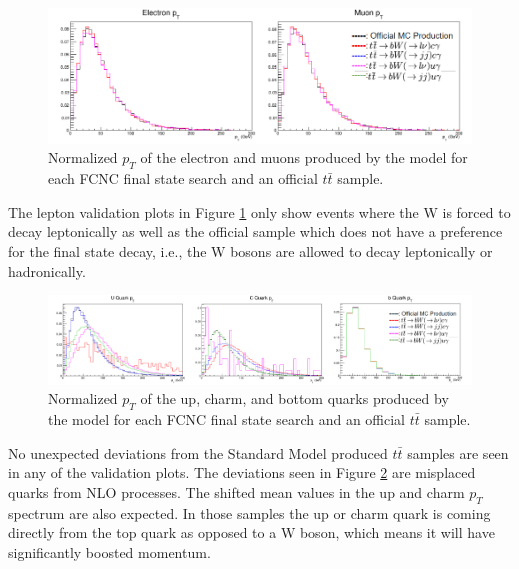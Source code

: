 \begin{figure}[h!]
	\centering
	\includegraphics[width=\columnwidth]{../ThesisImages/FCNCValidation/lepton.png}
	\caption{Normalized $p_T$ of the electron and muons produced by the model for each FCNC final state search and an official $t\bar{t}$ sample.
	}
	\label{fig:LepVal}
\end{figure} 

The lepton validation plots in Figure \ref{fig:LepVal} only show events where the W is forced to decay leptonically as well as the official sample which does not have a preference for the final state decay, i.e., the W bosons are allowed to decay leptonically or hadronically.  
\begin{figure}[h!]
	\centering
	\includegraphics[width=\columnwidth]{../ThesisImages/FCNCValidation/quarks.png}
	\caption{Normalized $p_T$ of the up, charm, and bottom quarks produced by the model for each FCNC final state search and an official $t\bar{t}$ sample.
	}
	\label{fig:QuarkVal}
\end{figure}
No unexpected deviations from the Standard Model produced $t\bar{t}$ samples are seen in any of the validation plots.  The deviations seen in Figure \ref{fig:QuarkVal} are misplaced quarks from NLO processes.  The shifted mean values in the up and charm $p_T$ spectrum are also expected.  In those samples the up or charm quark is coming directly from the top quark as opposed to a W boson, which means it will have significantly boosted momentum. 

